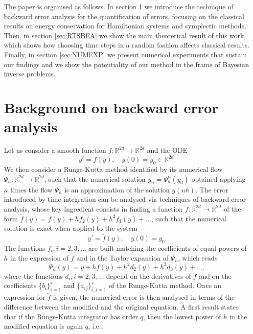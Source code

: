 \documentclass{siamart1116}
\numberwithin{theorem}{section}
\newcommand{\R}{\mathbb{R}}
\begin{document}
The paper is organised as follows. In section \ref{sec:BEA} we introduce the technique of backward error analysis for the quantification of errors, focusing on the classical results on energy conservation for Hamiltonian systems and symplectic methods. Then, in section \ref{sec:RTSBEA} we show the main theoretical result of this work, which shows how choosing time steps in a random fashion affects classical results. Finally, in section \ref{sec:NUMEXP} we present numerical experiments that sustain our findings and we show the potentiality of our method in the frame of Bayesian inverse problems.

\section{Background on backward error analysis}\label{sec:BEA} Let us consider a smooth function $f \colon \R^{2d} \to \R^{2d}$ and the ODE
\begin{equation}
	y' = f(y), \quad y(0) = y_0 \in \R^{2d}.
\end{equation}
We then consider a Runge-Kutta method identified by its numerical flow $\Psi_h \colon \R^{2d} \to \R^{2d}$, such that the numerical solution $y_n = \Psi_h^n(y_0)$ obtained applying $n$ times the flow $\Psi_h$ is an approximation of the solution $y(nh)$. The error introduced by time integration can be analysed via techniques of backward error analysis, whose key ingredient consists in finding a function $\tilde f\colon \R^{2d} \to \R^{2d}$ of the form $\tilde f(y) = f(y) + hf_2(y) + h^2 f_3(y) + \ldots$, such that the numerical solution is exact when applied to the system 
\begin{equation}
	y' = \tilde f(y), \quad y(0) = y_0.
\end{equation}
The functions $f_i, i = 2, 3, \ldots$ are built matching the coefficients of equal powers of $h$ in the expression of $\tilde f$ and in the Taylor expansion of $\Psi_h$, which reads
\begin{equation}
	\Psi_h(y) = y + h f(y) + h^2 d_2(y) + h^3 d_3(y) + \ldots,  
\end{equation}
where the functions $d_i, i = 2, 3, \ldots$ depend on the derivatives of $f$ and on the coefficients $\{b_i\}_{i=1}^s$ and $\{a_{ij}\}_{i,j=1}^s$ of the Runge-Kutta method. Once an expression for $\tilde f$ is given, the numerical error is then analysed in terms of the difference between the modified and the original equation. A first result states that if the Runge-Kutta integrator has order $q$, then the lowest power of $h$ in the modified equation is again $q$, i.e.,
\end{document}
